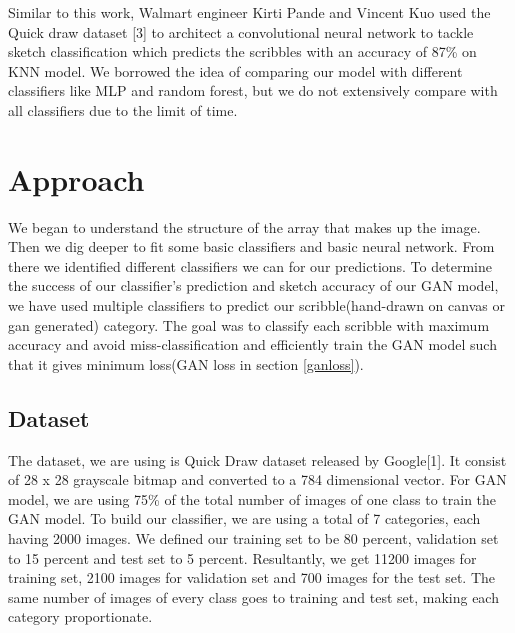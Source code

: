 \documentclass{article} %
\begin{document}
Similar to this work, Walmart engineer Kirti Pande and Vincent Kuo used the Quick draw dataset [3] to architect a convolutional neural network to tackle sketch classification which predicts the scribbles with an accuracy of 87\% on KNN model. We borrowed the idea of comparing our model with different classifiers like MLP and random forest, but we do not extensively compare with all classifiers due to the limit of time.




%
%

\section{Approach}
\label{approach}
We began to understand the structure of the array that makes up the image. Then we dig deeper to fit some basic classifiers and basic neural network. From there we identified different classifiers we can for our predictions. To determine the success of our classifier's prediction and sketch accuracy of our GAN model, we have used multiple classifiers to predict our scribble(hand-drawn on canvas or gan generated) category. The goal was to classify each scribble with maximum accuracy and avoid miss-classification and efficiently train the GAN model such that it gives minimum loss(GAN loss in section \ref{ganloss}).

\subsection{Dataset}
The dataset, we are using is Quick Draw dataset released by Google[1]. It consist of 28 x 28 grayscale bitmap and converted to a 784 dimensional vector. For GAN model, we are using 75\% of the total number of images of one class to train the GAN model.
To build our classifier, we are using a total of 7 categories, each having 2000 images. We defined our training set to be 80 percent, validation set to 15 percent and test set to 5 percent. Resultantly, we get 11200 images for training set, 2100 images for validation set and 700 images for the test set. The same number of images of every class goes to training and test set, making each category proportionate.
\end{document}
